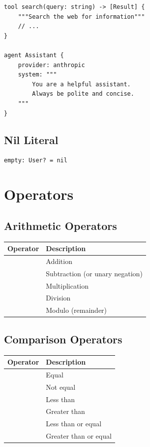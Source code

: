 \begin{lstlisting}
tool search(query: string) -> [Result] {
    """Search the web for information"""
    // ...
}

agent Assistant {
    provider: anthropic
    system: """
        You are a helpful assistant.
        Always be polite and concise.
    """
}
\end{lstlisting}

\subsection{Nil Literal}

\begin{lstlisting}
empty: User? = nil
\end{lstlisting}

\section{Operators}

\subsection{Arithmetic Operators}

\begin{table}[h]
\centering
\begin{tabular}{ll}
\toprule
\textbf{Operator} & \textbf{Description} \\
\midrule
\code{+} & Addition \\
\code{-} & Subtraction (or unary negation) \\
\code{*} & Multiplication \\
\code{/} & Division \\
\code{\%} & Modulo (remainder) \\
\bottomrule
\end{tabular}
\end{table}

\subsection{Comparison Operators}

\begin{table}[h]
\centering
\begin{tabular}{ll}
\toprule
\textbf{Operator} & \textbf{Description} \\
\midrule
\code{==} & Equal \\
\code{!=} & Not equal \\
\code{<} & Less than \\
\code{>} & Greater than \\
\code{<=} & Less than or equal \\
\code{>=} & Greater than or equal \\
\bottomrule
\end{tabular}
\end{table}

